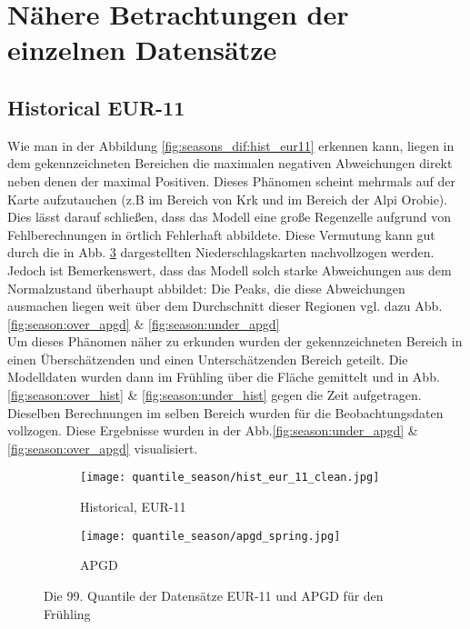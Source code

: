 \section{Nähere Betrachtungen der einzelnen Datensätze}
\subsection{Historical EUR-11} \label{subsec:hist_eur11}
Wie man in der Abbildung \ref{fig:seasons_dif:hist_eur11} erkennen kann, liegen in dem gekennzeichneten Bereichen die maximalen negativen Abweichungen direkt neben denen der maximal Positiven. Dieses Phänomen scheint mehrmals auf der Karte aufzutauchen (z.B im Bereich von Krk und im Bereich der Alpi Orobie). Dies lässt darauf schließen, dass das Modell eine große Regenzelle aufgrund von Fehlberechnungen in örtlich Fehlerhaft abbildete. Diese Vermutung kann gut durch die in Abb. \ref{fig:seasons_hist} dargestellten Niederschlagskarten nachvollzogen werden. Jedoch ist Bemerkenswert, dass das Modell solch starke Abweichungen aus dem Normalzustand überhaupt abbildet: Die Peaks, die diese Abweichungen ausmachen liegen weit über dem Durchschnitt dieser Regionen vgl. dazu Abb.\ref{fig:season:over_apgd} \& \ref{fig:season:under_apgd}\\
Um dieses Phänomen näher zu erkunden wurden der gekennzeichneten Bereich in einen Überschätzenden und einen Unterschätzenden Bereich geteilt. Die Modelldaten wurden dann im Frühling über die Fläche gemittelt und in Abb.\ref{fig:season:over_hist} \& \ref{fig:season:under_hist} gegen die Zeit aufgetragen. Dieselben Berechnungen im selben Bereich wurden für die Beobachtungsdaten vollzogen. Diese Ergebnisse wurden in der Abb.\ref{fig:season:under_apgd} \& \ref{fig:season:over_apgd} visualisiert.\\
\begin{figure}[h]
	\begin{subfigure}{0.49\textwidth}
		\texttt{[image: quantile\_season/hist\_eur\_11\_clean.jpg]}
		\caption{Historical, EUR-11}
		\label{fig:seasons_hist:hist}
	\end{subfigure}
	\begin{subfigure}{0.49\textwidth}
		\texttt{[image: quantile\_season/apgd\_spring.jpg]}
		\caption{APGD}
		\label{fig:seasons_hist:apgd}
	\end{subfigure}
	\caption{Die 99. Quantile der Datensätze EUR-11 und APGD für den Frühling}
	\label{fig:seasons_hist}
\end{figure}
